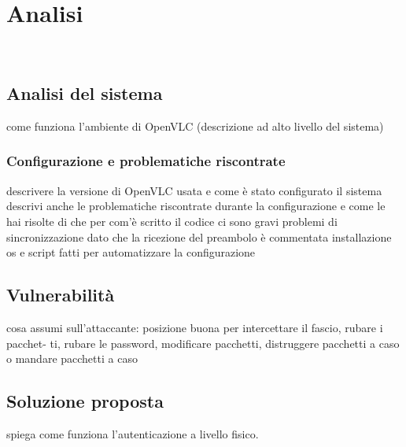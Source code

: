 \chapter{Analisi}
\label{cap:analisi}

\\

\section{Analisi del sistema}
come funziona l'ambiente di OpenVLC (descrizione ad alto livello del sistema)
\subsection{Configurazione e problematiche riscontrate}
descrivere la versione di OpenVLC usata e come è stato configurato il sistema
descrivi anche le problematiche riscontrate durante la configurazione e come le hai risolte
di che per com'è scritto il codice ci sono gravi problemi di sincronizzazione dato che la ricezione del preambolo è commentata
installazione os e script fatti per automatizzare la configurazione

\section{Vulnerabilità}
cosa assumi sull'attaccante: posizione buona per intercettare il fascio, rubare i pacchet-
ti, rubare le password, modificare pacchetti, distruggere pacchetti a caso o mandare
pacchetti a caso

\section{Soluzione proposta}
spiega come funziona l'autenticazione a livello fisico.